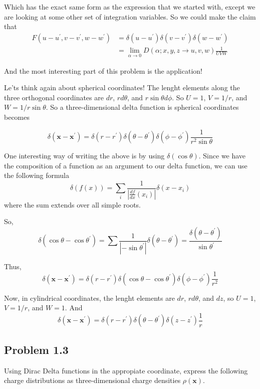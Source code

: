 Which has the exact same form as the expression that we started with, except we are looking at some other set of integration variables.
So we could make the claim that
\begin{align*}
F(u-u^\prime, v-v^\prime, w-w^\prime) &= \delta(u-u^\prime) \delta(v-v^\prime) \delta(w-w^\prime) \\
&= \lim_{\alpha\rightarrow 0} D(\alpha; x, y, z \rightarrow u, v, w) \frac{1}{UVW}
\end{align*}


And the most interesting part of this problem is the application!

Le'ts think again about spherical coordinates!
The lenght elements along the three orthogonal coordinates are $dr$, $rd\theta$, and $r\sin\theta d\phi$.
So $U=1$, $V=1/r$, and $W=1/r\sin\theta$.
So a three-dimensional delta function is spherical coordinates becomes

$$
\delta\left(\mathbf{x}-\mathbf{x}^\prime\right) =
\delta(r-r^\prime) \delta(\theta-\theta^\prime) \delta(\phi-\phi^\prime) \frac{1}{r^2 \sin\theta}
$$

One interesting way of writing the above is by using $\delta(\cos\theta)$.
Since we have the composition of a function as an argument to our delta function, we can use the following formula
$$
\delta\left(f(x)\right) = \sum_i \frac{1}{\left|\frac{df}{dx} (x_i)\right|} \delta(x-x_i)
$$
where the sum extends over all simple roots.

So,
$$
\delta(\cos\theta - \cos\theta^\prime)
= \sum \frac{1}{\left|-\sin\theta^\prime \right|} \delta(\theta-\theta^\prime)
= \frac{\delta(\theta-\theta^\prime)}{\sin\theta^\prime}
$$

Thus,
$$
\delta\left(\mathbf{x}-\mathbf{x}^\prime\right) =
\delta(r-r^\prime) \delta(\cos\theta-\cos\theta^\prime) \delta(\phi-\phi^\prime) \frac{1}{r^2}
$$

Now, in cylindrical coordinates, the lenght elements are $dr$, $rd\theta$, and $dz$, so
$U=1$, $V=1/r$, and $W=1$.
And
$$
\delta\left(\mathbf{x}-\mathbf{x}^\prime\right) =
\delta(r-r^\prime) \delta(\theta-\theta^\prime) \delta(z-z^\prime) \frac{1}{r}
$$


\subsection{Problem 1.3}

Using Dirac Delta functions in the appropiate coordinate, express the following charge distributions as three-dimensional
charge densities $\rho(\mathbf{x})$.

